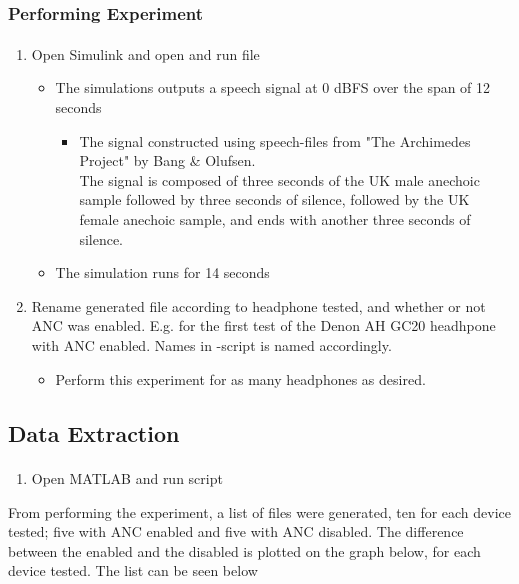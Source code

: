 	\subsubsection{Performing Experiment}
	\begin{enumerate}
		\item Open Simulink\textsuperscript{\textregistered} and open and run file 
		\begin{itemize} 
			\item The simulations outputs a speech signal at 0 dBFS over the span of 12 seconds
			\begin{itemize}
				\item [] The signal constructed using speech-files from "The Archimedes Project" by Bang \& Olufsen. \\
				The signal is composed of three seconds of the UK male anechoic sample followed by three seconds of silence, followed by the UK female anechoic sample, and ends with another three seconds of silence.
			\end{itemize}
			\item The simulation runs for 14 seconds
		\end{itemize}
		\item Rename generated file  according to headphone tested, and whether or not ANC was enabled. E.g.  for the first test of the Denon AH GC20 headhpone with ANC enabled. Names in -script is named accordingly.
				\begin{itemize}
			\item[] Perform this experiment for as many headphones as desired.
		\end{itemize}
	\end{enumerate}
	
		
\subsection{Data Extraction}
\begin{enumerate}
	\item Open MATLAB\textsuperscript{\textregistered} and run script 
\end{enumerate}

From performing the experiment, a list of files were generated, ten for each device tested; five with ANC enabled and five with ANC disabled.
The difference between the enabled and the disabled is plotted on the graph below, for each device tested. The list can be seen below

